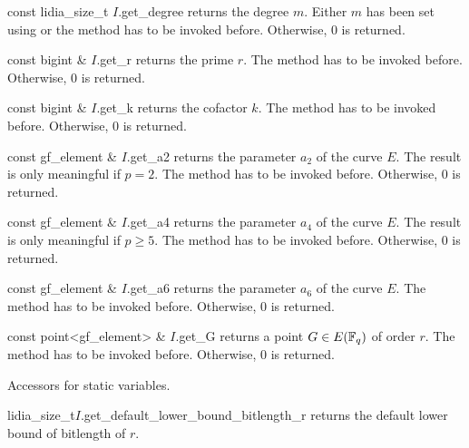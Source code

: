 \begin{cfcode}{const lidia_size_t }{$I$.get_degree}{} 
  returns the degree $m.$ Either $m$ has been set using  or
  the method  has to be invoked before. Otherwise,
  0 is returned.
\end{cfcode}

\begin{cfcode}{const bigint & }{$I$.get_r}{} 
  returns the prime $r.$
  The method  has to be invoked before. Otherwise,
  0 is returned.
\end{cfcode}

\begin{cfcode}{const bigint & }{$I$.get_k}{} 
  returns the cofactor $k.$
  The method  has to be invoked before. Otherwise,
  0 is returned.
\end{cfcode}

\begin{cfcode}{const gf_element & }{$I$.get_a2}{} 
  returns the parameter $a_2$ of the curve $E.$ The result is only meaningful
  if $p=2.$ The method  has to be invoked before. Otherwise,
  0 is returned.
\end{cfcode}

\begin{cfcode}{const gf_element & }{$I$.get_a4}{} 
  returns the parameter $a_4$ of the curve $E.$ The result is only meaningful
  if $p\geq 5.$
  The method  has to be invoked before. Otherwise,
  0 is returned.
\end{cfcode}

\begin{cfcode}{const gf_element & }{$I$.get_a6}{} 
  returns the parameter $a_6$ of the curve $E.$
  The method  has to be invoked before. Otherwise,
  0 is returned.
\end{cfcode}

\begin{cfcode}{const point<gf_element> & }{$I$.get_G}{} 
  returns a point $G\in E(\mathbb{F}_q)$ of order $r.$
  The method  has to be invoked before. Otherwise,
  0 is returned.
\end{cfcode}

Accessors for static variables.

\begin{cfcode}{lidia_size_t}{$I$.get_default_lower_bound_bitlength_r}{}
  returns the default lower bound of bitlength of $r.$
\end{cfcode}

